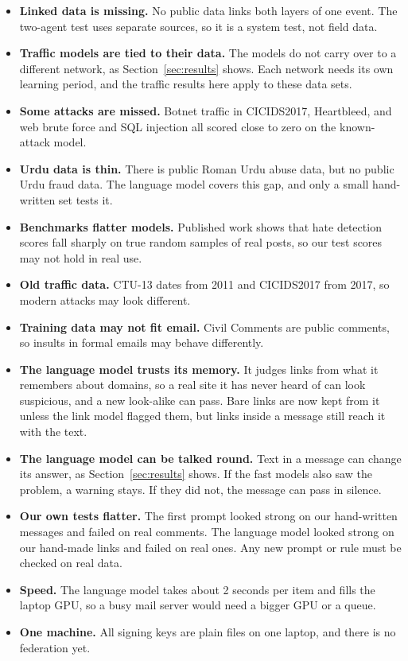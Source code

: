 \documentclass[11pt,a4paper]{article}
\begin{document}
\begin{itemize}
  \item \textbf{Linked data is missing.} No public data links both layers of one event. The two-agent test uses separate sources, so it is a system test, not field data.
  \item \textbf{Traffic models are tied to their data.} The models do not carry over to a different network, as Section~\ref{sec:results} shows. Each network needs its own learning period, and the traffic results here apply to these data sets.
  \item \textbf{Some attacks are missed.} Botnet traffic in CICIDS2017, Heartbleed, and web brute force and SQL injection all scored close to zero on the known-attack model.
  \item \textbf{Urdu data is thin.} There is public Roman Urdu abuse data, but no public Urdu fraud data. The language model covers this gap, and only a small hand-written set tests it.
  \item \textbf{Benchmarks flatter models.} Published work shows that hate detection scores fall sharply on true random samples of real posts, so our test scores may not hold in real use.
  \item \textbf{Old traffic data.} CTU-13 dates from 2011 and CICIDS2017 from 2017, so modern attacks may look different.
  \item \textbf{Training data may not fit email.} Civil Comments are public comments, so insults in formal emails may behave differently.
  \item \textbf{The language model trusts its memory.} It judges links from what it remembers about domains, so a real site it has never heard of can look suspicious, and a new look-alike can pass. Bare links are now kept from it unless the link model flagged them, but links inside a message still reach it with the text.
  \item \textbf{The language model can be talked round.} Text in a message can change its answer, as Section~\ref{sec:results} shows. If the fast models also saw the problem, a warning stays. If they did not, the message can pass in silence.
  \item \textbf{Our own tests flatter.} The first prompt looked strong on our hand-written messages and failed on real comments. The language model looked strong on our hand-made links and failed on real ones. Any new prompt or rule must be checked on real data.
  \item \textbf{Speed.} The language model takes about 2 seconds per item and fills the laptop GPU, so a busy mail server would need a bigger GPU or a queue.
  \item \textbf{One machine.} All signing keys are plain files on one laptop, and there is no federation yet.
\end{itemize}
\end{document}
